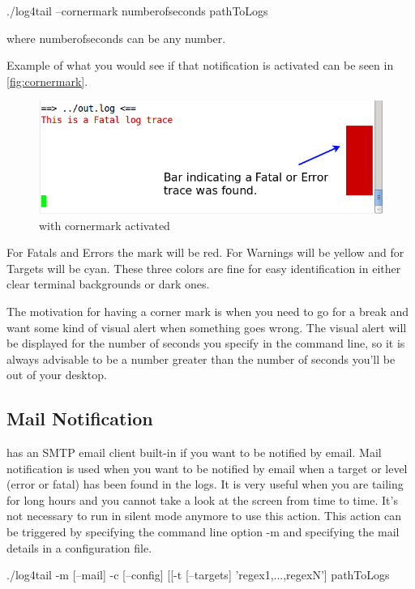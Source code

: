 \begin{cmd}
  ./log4tail --cornermark numberofseconds pathToLogs
\end{cmd}
where numberofseconds can be any number. 

Example of what you would see if that notification is activated can be seen in
 \autoref{fig:cornermark}.

\begin{figure}[ht]
\centering
\includegraphics[scale=0.60]{terminalcornermark.png}
\caption{\logftailer{} with cornermark activated}\label{fig:cornermark}
\end{figure}

For Fatals and Errors the mark will be red. For Warnings will be yellow and for Targets 
will be cyan. These three colors are fine for easy identification in either clear terminal
backgrounds or dark ones.

The motivation for having a corner mark is when you need to go for a break and
want some kind of visual alert when something goes wrong. The visual alert will
be displayed for the number of seconds you specify in the command line, so it
is always advisable to be a number greater than the number of seconds you'll be
out of your desktop. 

\subsection{Mail Notification}
\label{sec:mailnotification}
\logftailer{} has an SMTP email client built-in if you want to be notified by email.
Mail notification is used when you want to be notified by email when a target or level (error or fatal) has been found 
in the logs. It is very useful when you are tailing for long hours and you cannot take 
a look at the screen from time to time. It's not necessary to run in silent mode anymore 
to use this action.
This action can be triggered by specifying the command line option -m and
specifying the mail details in a configuration file. 

\begin{cmd}
 ./log4tail -m [--mail] -c [--config] [[-t [--targets] 'regex1,...,regexN'] pathToLogs
\end{cmd}

